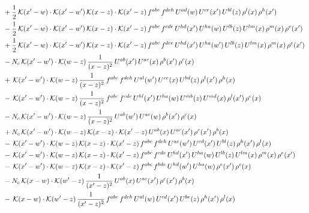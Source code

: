 \documentclass[9pt]{article}
\numberwithin{equation}{section}
\begin{document}
\begin{align}
&+\frac{1}{2}\,\mathcal{K}(x'-w)\cdot\mathcal{K}(x'-w')\,\mathcal{K}(x-z)\cdot\mathcal{K}(x'-z)\,f^{abc}\,f^{deh}\,U^{ad}(w)\,U^{ce}(x')\,U^{bl}(z)\,\rho^{l}(x)\,\rho^{h}(x')\notag \\
&-\frac{1}{2}\,\mathcal{K}(x'-w)\cdot\mathcal{K}(x'-w')\,\mathcal{K}(x-z)\cdot\mathcal{K}(x'-z)\,f^{abc}\,f^{cde}\,U^{hd}(x')\,U^{ha}(w)\,U^{lb}(z)\,U^{lm}(x)\,\rho^{m}(x)\,\rho^{e}(x')\notag \\
&+\frac{1}{2}\,\mathcal{K}(x'-w)\cdot\mathcal{K}(x'-w')\,\mathcal{K}(x-z)\cdot\mathcal{K}(x'-z)\,f^{abc}\,f^{dce}\,U^{hd}(x')\,U^{ha}(w')\,U^{lb}(z)\,U^{lm}(x)\,\rho^{m}(x)\,\rho^{e}(x')\notag \\
&-N_{c}\,\mathcal{K}(x'-w')\cdot\mathcal{K}(w-z)\,\frac{1}{(x-z)^{2}}\,U^{ab}(x')\,U^{ac}(x)\,\rho^{b}(x')\,\rho^{c}(x)\notag \\
&+\,\mathcal{K}(x'-w')\cdot\mathcal{K}(w-z)\,\frac{1}{(x-z)^{2}}\,f^{abc}\,f^{deh}\,U^{al}(w')\,U^{ce}(x)\,U^{bd}(z)\,\rho^{l}(x')\,\rho^{h}(x)\notag \\
&-\,\mathcal{K}(x'-w')\cdot\mathcal{K}(w-z)\,\frac{1}{(x-z)^{2}}\,f^{abc}\,f^{cde}\,U^{hl}(x')\,U^{ha}(w)\,U^{mb}(z)\,U^{md}(x)\,\rho^{l}(x')\,\rho^{e}(x)\notag \\
&-N_{c}\,\mathcal{K}(x'-w')\cdot\mathcal{K}(w-z)\,\frac{1}{(x-z)^{2}}\,U^{ab}(w')\,U^{ac}(w)\,\rho^{b}(x')\,\rho^{c}(x)\notag \\
&+N_{c}\,\mathcal{K}(x'-w')\cdot\mathcal{K}(w-z)\,\mathcal{K}(x-z)\cdot\mathcal{K}(x'-z)\,U^{ab}(x)\,U^{ac}(x')\,\rho^{c}(x')\,\rho^{b}(x)\notag \\
&-\,\mathcal{K}(x'-w')\cdot\mathcal{K}(w-z)\,\mathcal{K}(x-z)\cdot\mathcal{K}(x'-z)\,f^{abc}\,f^{deh}\,U^{ae}(w')\,U^{cd}(x')\,U^{bl}(z)\,\rho^{h}(x')\,\rho^{l}(x)\notag \\
&-\,\mathcal{K}(x'-w')\cdot\mathcal{K}(w-z)\,\mathcal{K}(x-z)\cdot\mathcal{K}(x'-z)\,f^{abc}\,f^{cde}\,U^{hd}(x')\,U^{ha}(w)\,U^{lb}(z)\,U^{lm}(x)\,\rho^{m}(x)\,\rho^{e}(x')\notag \\
&-\,\mathcal{K}(x'-w')\cdot\mathcal{K}(w-z)\,\mathcal{K}(x-z)\cdot\mathcal{K}(x'-z)\,f^{abc}\,f^{bde}\,U^{hd}(w')\,U^{ha}(w)\,\rho^{e}(x')\,\rho^{c}(x)\notag \\
&-N_{c}\,\mathcal{K}(x-w)\cdot\mathcal{K}(w'-z)\,\frac{1}{(x'-z)^{2}}\,U^{ab}(x)\,U^{ac}(x')\,\rho^{c}(x')\,\rho^{b}(x)\notag \\
&-\,\mathcal{K}(x-w)\cdot\mathcal{K}(w'-z)\,\frac{1}{(x'-z)^{2}}\,f^{abc}\,f^{deh}\,U^{al}(w)\,U^{cd}(x')\,U^{be}(z)\,\rho^{h}(x')\,\rho^{l}(x)\notag \\

\end{align}
\end{document}
